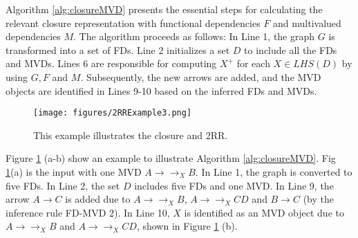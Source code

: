    



Algorithm \ref{alg:closureMVD} presents the essential steps for calculating the relevant closure representation with functional dependencies $F$ and multivalued dependencies $M$. The algorithm proceeds as follows: In Line 1, the graph $G$ is transformed into a set of FDs. Line 2 initializes a set $D$ to include all the FDs and MVDs. Lines 6 are responsible for computing $X^+$  for each $X \in LHS(D)$ by using $G, F$ and $M$. Subsequently, the new arrows are added, and the MVD objects are identified in Lines 9-10 based on the inferred FDs and MVDs. 





\begin{figure}\centering\texttt{[image: figures/2RRExample3.png]}\caption{This example illustrates the closure and 2RR.}\label{fig:2RRExample}\end{figure}


\begin{example}  Figure \ref{fig:2RRExample} (a-b) show an example to illustrate Algorithm \ref{alg:closureMVD}. Fig \ref{fig:2RRExample}(a) is the input with one MVD $A \to\to_X B$. In Line 1, the graph is converted to five FDs. In Line 2, the set $D$ includes five FDs and one MVD.  In Line 9, the arrow $A \to C$ is added due to $A \to\to_X B$, $A \to\to_X CD$ and $B \to C$ (by the inference rule FD-MVD 2). In Line 10, $X$ is identified as an MVD object due to $A \to\to_X B$ and $A \to\to_X CD$, shown in Figure \ref{fig:2RRExample} (b). 
\label{exp:CloureMVDExample}
\end{example}






